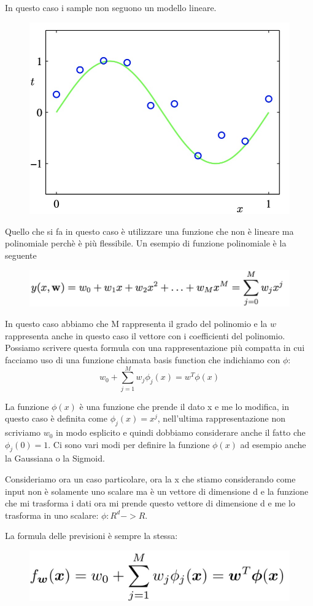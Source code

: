 \documentclass[14pt]{extreport}
\begin{document}
In questo caso i sample non seguono un modello lineare.

\begin{figure}[H]
\centering
\includegraphics[width=0.5\linewidth]{76.jpeg}
\end{figure}

Quello che si fa in questo caso è utilizzare una funzione che non è lineare ma polinomiale perchè è più flessibile. Un esempio di funzione polinomiale
è la seguente

\begin{figure}[H]
\centering
\includegraphics[width=0.7\linewidth]{77.jpeg}
\end{figure}

In questo caso abbiamo che M rappresenta il grado del polinomio e la $w$ rappresenta anche in questo caso il vettore con i coefficienti del polinomio.
Possiamo scrivere questa formula con una rappresentazione più compatta in cui facciamo uso di una funzione chiamata basis function che indichiamo con
$\phi$:
$$w_0+\sum_{j=1}^M w_j\phi_j(x) = w^T\phi(x)$$

La funzione $\phi(x)$ è una funzione che prende il dato x e me lo modifica, in questo caso è definita come $\phi_j(x) = x^j$, nell'ultima
rappresentazione non scriviamo $w_0$ in modo esplicito e quindi dobbiamo considerare anche il fatto che $\phi_j(0)=1$. Ci sono vari modi per definire
la funzione $\phi(x)$ ad esempio anche la Gaussiana o la Sigmoid.

Consideriamo ora un caso particolare, ora la x che stiamo considerando come input non è solamente uno scalare ma è un vettore di dimensione d e la
funzione che mi trasforma i dati ora mi prende questo vettore di dimensione d e me lo trasforma in uno scalare: $\phi: R^d->R$.

La formula delle previsioni è sempre la stessa:
\begin{figure}[H]
\centering
\includegraphics[width=0.5\linewidth]{78.jpeg}
\end{figure}
\end{document}
